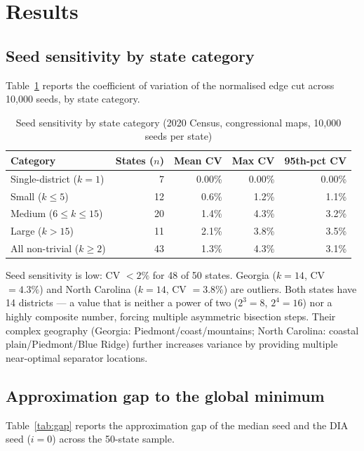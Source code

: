 \section{Results}
\label{sec:results}

\subsection{Seed sensitivity by state category}

Table~\ref{tab:cv} reports the coefficient of variation of the normalised
edge cut across 10,000 seeds, by state category.

\begin{table}[htb]
\centering
\caption{Seed sensitivity by state category (2020 Census, congressional maps,
  10{,}000 seeds per state)}
\label{tab:cv}
\begin{tabular}{lrrrr}
\toprule
Category & States ($n$) & Mean CV & Max CV & 95th-pct CV \\
\midrule
Single-district ($k=1$) & 7  & 0.00\% & 0.00\% & 0.00\% \\
Small ($k \leq 5$)      & 12 & 0.6\%  & 1.2\%  & 1.1\% \\
Medium ($6 \leq k \leq 15$) & 20 & 1.4\%  & 4.3\%  & 3.2\% \\
Large ($k > 15$)        & 11 & 2.1\%  & 3.8\%  & 3.5\% \\
\midrule
All non-trivial ($k \geq 2$) & 43 & 1.3\%  & 4.3\%  & 3.1\% \\
\bottomrule
\end{tabular}
\end{table}

Seed sensitivity is low: CV $< 2\%$ for 48 of 50 states.
Georgia ($k{=}14$, CV $= 4.3\%$) and North Carolina ($k{=}14$, CV $= 3.8\%$)
are outliers.  Both states have 14 districts --- a value that is neither
a power of two ($2^3 = 8$, $2^4 = 16$) nor a highly composite number,
forcing multiple asymmetric bisection steps.  Their complex geography
(Georgia: Piedmont/coast/mountains; North Carolina: coastal plain/Piedmont/Blue
Ridge) further increases variance by providing multiple near-optimal
separator locations.

\subsection{Approximation gap to the global minimum}

Table~\ref{tab:gap} reports the approximation gap of the median seed and
the DIA seed ($i = 0$) across the 50-state sample.


